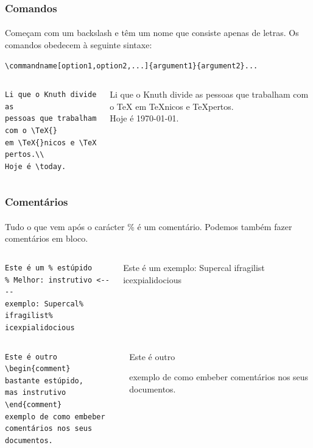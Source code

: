 \begin{frame}[fragile]
\frametitle{Comandos}
\framesubtitle{}
Começam com um backslash e têm um nome que consiste apenas de letras. Os comandos obedecem à seguinte sintaxe:

\begin{verbatim}
\commandname[option1,option2,...]{argument1}{argument2}...
\end{verbatim}

  \scriptsize
  \begin{columns}[c]
  \begin{verbatim}
Li que o Knuth divide as
pessoas que trabalham com o \TeX{}
em \TeX{}nicos e \TeX pertos.\\
Hoje é \today.
  \end{verbatim}
  \begin{fmpage}{\textwidth}
Li que o Knuth divide as
pessoas que trabalham com o \TeX{}
em \TeX{}nicos e \TeX pertos.\\
Hoje é \today.
   \end{fmpage}
  \end{columns}
\end{frame}



\begin{frame}[fragile]
\frametitle{Comentários}
\framesubtitle{}
Tudo o que vem após o carácter \% é um comentário. Podemos também fazer comentários em bloco.

  \scriptsize
  \begin{columns}[c]
  \begin{verbatim}
Este é um % estúpido
% Melhor: instrutivo <----
exemplo: Supercal%
ifragilist%
icexpialidocious
  \end{verbatim}
  \begin{fmpage}{\textwidth}
Este é um %
exemplo: Supercal%
ifragilist%
icexpialidocious
   \end{fmpage}
  \end{columns}
  \begin{columns}[c]
  \begin{verbatim}
Este é outro
\begin{comment}
bastante estúpido,
mas instrutivo
\end{comment}
exemplo de como embeber
comentários nos seus documentos.
  \end{verbatim}
  \begin{fmpage}{\textwidth}
Este é outro

exemplo de como embeber
comentários nos seus documentos.
   \end{fmpage}
  \end{columns}
\end{frame}


